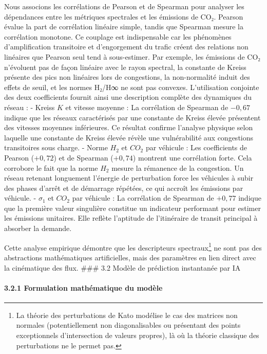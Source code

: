 \documentclass[10pt, a4paper]{article}
\begin{document}
Nous associons les corrélations de Pearson et de Spearman pour analyser
les dépendances entre les métriques spectrales et les émissions de CO₂.
Pearson évalue la part de corrélation linéaire simple, tandis que
Spearman mesure la corrélation monotone. Ce couplage est indispensable
car les phénomènes d'amplification transitoire et d'engorgement du
trafic créent des relations non linéaires que Pearson seul tend à
sous-estimer. Par exemple, les émissions de CO₂ n'évoluent pas de façon
linéaire avec le rayon spectral, la constante de Kreiss présente des
pics non linéaires lors de congestions, la non-normalité induit des
effets de seuil, et les normes H₂/H∞ ne sont pas convexes. L'utilisation
conjointe des deux coefficients fournit ainsi une description complète
des dynamiques du réseau : - Kreiss \(K\) et vitesse moyenne : La
corrélation de Spearman de \(-0,67\) indique que les réseaux
caractérisés par une constante de Kreiss élevée présentent des vitesses
moyennes inférieures. Ce résultat confirme l'analyse physique selon
laquelle une constante de Kreiss élevée révèle une vulnérabilité aux
congestions transitoires sous charge. - Norme \(H_2\) et \(CO_2\) par
véhicule : Les coefficients de Pearson (\(+0,72\)) et de Spearman
(\(+0,74\)) montrent une corrélation forte. Cela corrobore le fait que
la norme \(H_2\) mesure la rémanence de la congestion. Un réseau
retenant longuement l'énergie de perturbation force les véhicules à
subir des phases d'arrêt et de démarrage répétées, ce qui accroît les
émissions par véhicule. - \(\sigma_1\) et \(CO_2\) par véhicule : La
corrélation de Spearman de \(+0,77\) indique que la première valeur
singulière constitue un indicateur performant pour estimer les émissions
unitaires. Elle reflète l'aptitude de l'itinéraire de transit principal
à absorber la demande.

Cette analyse empirique démontre que les descripteurs
spectraux\footnote{La théorie des perturbations de Kato modélise le cas des matrices non normales (potentiellement non diagonalisables ou présentant des points exceptionnels d'intersection de valeurs propres), là où la théorie classique des perturbations ne le permet pas.}
ne sont pas des abstractions mathématiques artificielles, mais des
paramètres en lien direct avec la cinématique des flux. \#\#\# 3.2
Modèle de prédiction instantanée par IA

\paragraph{3.2.1 Formulation mathématique du
modèle}\label{formulation-mathuxe9matique-du-moduxe8le}
\end{document}
